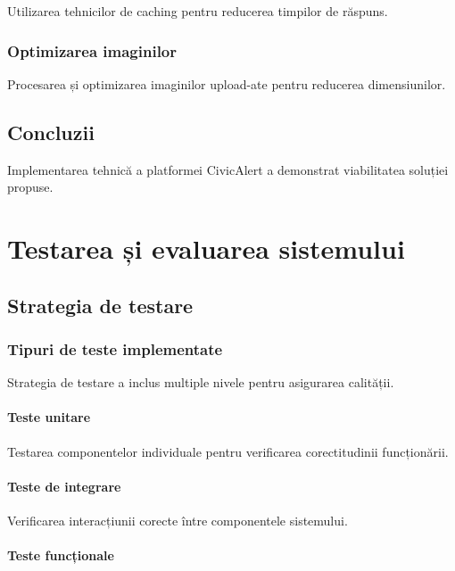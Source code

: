 \documentclass[12pt,a4paper]{report}
\begin{document}
Utilizarea tehnicilor de caching pentru reducerea timpilor de răspuns.

\subsection{Optimizarea imaginilor}

Procesarea și optimizarea imaginilor upload-ate pentru reducerea dimensiunilor.

\section{Concluzii}

Implementarea tehnică a platformei CivicAlert a demonstrat viabilitatea soluției propuse.

\newpage
\chapter{Testarea și evaluarea sistemului}

\section{Strategia de testare}

\subsection{Tipuri de teste implementate}

Strategia de testare a inclus multiple nivele pentru asigurarea calității.

\subsubsection{Teste unitare}

Testarea componentelor individuale pentru verificarea corectitudinii funcționării.

\subsubsection{Teste de integrare}

Verificarea interacțiunii corecte între componentele sistemului.

\subsubsection{Teste funcționale}
\end{document}
